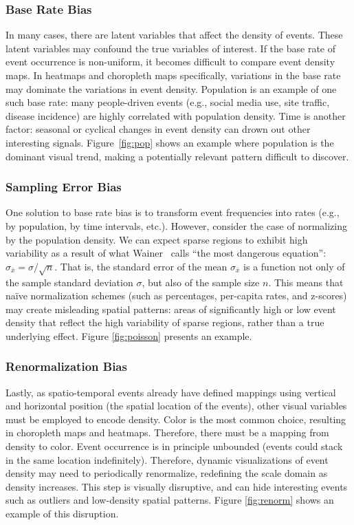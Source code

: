 \documentclass[journal]{vgtc}                %
\begin{document}
\subsubsection{Base Rate Bias}
\label{sec:bias1}
\popFig

In many cases, there are latent variables that affect the density of events. These latent variables may confound the true variables of interest. If the base rate of event occurrence is non-uniform, it becomes difficult to compare event density maps. In heatmaps and choropleth maps specifically, variations in the base rate may dominate the variations in event density. Population is an example of one such base rate: many people-driven events (e.g., social media use, site traffic, disease incidence) are highly correlated with population density. Time is another factor: seasonal or cyclical changes in event density can drown out other interesting signals. Figure~\ref{fig:pop} shows an example where population is the dominant visual trend, making a potentially relevant pattern difficult to discover.

\subsubsection{Sampling Error Bias}
\label{sec:bias2}
\poissonFig

One solution to base rate bias is to transform event frequencies into rates (e.g., by population, by time intervals, etc.). However, consider the case of normalizing by the population density. We can expect sparse regions to exhibit high variability as a result of what Wainer~\cite{wainer2007most} calls ``the most dangerous equation'': $\sigma_{\bar{x}} = \sigma / \sqrt{n}$. That is, the standard error of the mean $\sigma_{\bar{x}}$ is a function not only of the sample standard deviation $\sigma$, but also of the sample size $n$. This means that na\"ive normalization schemes (such as percentages, per-capita rates, and z-scores) may create misleading spatial patterns: areas of significantly high or low event density that reflect the high variability of sparse regions, rather than a true underlying effect. Figure \ref{fig:poisson} presents an example.

\subsubsection{Renormalization Bias}
\label{sec:bias3}
\renormFig

Lastly, as spatio-temporal events already have defined mappings using vertical and horizontal position (the spatial location of the events), other visual variables must be employed to encode density. Color is the most common choice, resulting in choropleth maps and heatmaps. Therefore, there must be a mapping from density to color. Event occurrence is in principle unbounded (events could stack in the same location indefinitely). Therefore, dynamic visualizations of event density may need to periodically renormalize, redefining the scale domain as density increases. This step is visually disruptive, and can hide interesting events such as outliers and low-density spatial patterns. Figure \ref{fig:renorm} shows an example of this disruption.
\end{document}
